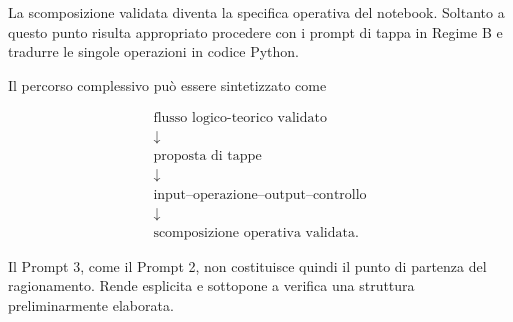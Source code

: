 La scomposizione validata diventa la specifica operativa del notebook.
Soltanto a questo punto risulta appropriato procedere con i prompt di tappa in
Regime B e tradurre le singole operazioni in codice Python.

Il percorso complessivo pu\`{o} essere sintetizzato come


\[
\begin{array}{c}
\text{flusso logico-teorico validato}
\\[3pt]
\downarrow
\\[3pt]
\text{proposta di tappe}
\\[3pt]
\downarrow
\\[3pt]
\text{input--operazione--output--controllo}
\\[3pt]
\downarrow
\\[3pt]
\text{scomposizione operativa validata}.
\end{array}
\]



Il Prompt 3, come il Prompt 2, non costituisce quindi il punto di partenza del
ragionamento. Rende esplicita e sottopone a verifica una struttura
preliminarmente elaborata.






